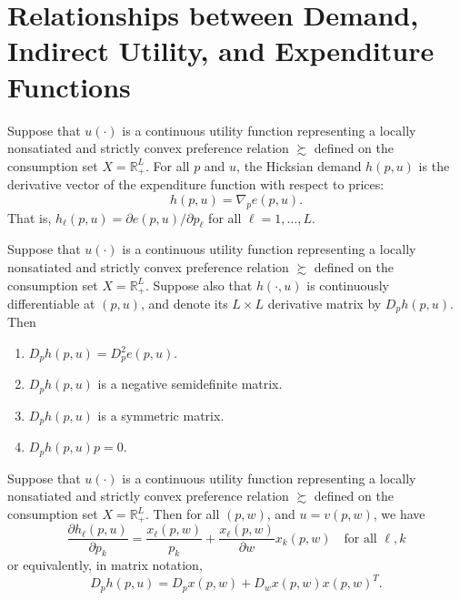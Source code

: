 \section{Relationships between Demand, Indirect Utility, and Expenditure Functions}

\begin{prop}
    Suppose that $u(\cdot)$ is a continuous utility function representing a locally nonsatiated and strictly convex preference relation $\succsim$ defined on the consumption set $X = \mathbb{R}^L_+$. For all $p$ and $u$, the Hicksian demand $h(p, u)$ is the derivative vector of the expenditure function with respect to prices:
    \begin{equation*}
        h(p, u) = \nabla_p e(p, u).
    \end{equation*}
    That is, $h_\ell (p, u) = \partial e(p, u) / \partial p_\ell$ for all $\ell = 1, \dots, L$.
\end{prop}

\begin{prop}
    Suppose that $u(\cdot)$ is a continuous utility function representing a locally nonsatiated and strictly convex preference relation $\succsim$ defined on the consumption set $X = \mathbb{R}^L_+$. Suppose also that $h(\cdot, u)$ is continuously differentiable at $(p, u)$, and denote its $L \times L$ derivative matrix by $D_p h(p, u)$. Then
    \begin{enumerate}
        \item $D_p h(p, u) = D_p^2 e(p, u).$
        \item $D_p h(p, u)$ is a negative semidefinite matrix.
        \item $D_p h(p, u)$ is a symmetric matrix.
        \item $D_p h(p, u) p = 0$.
    \end{enumerate}
\end{prop}

\begin{prop}
    Suppose that $u(\cdot)$ is a continuous utility function representing a locally nonsatiated and strictly convex preference relation $\succsim$ defined on the consumption set $X = \mathbb{R}^L_+$. Then for all $(p, w)$, and $u = v(p, w)$, we have 
    \begin{equation*}
        \frac{\partial h_\ell (p, u)}{\partial p_k} = \frac{x_\ell (p, w)}{p_k} + \frac{x_\ell (p, w)}{\partial w} x_k (p, w) \quad \text{for all } \ell, k
    \end{equation*}
    or equivalently, in matrix notation,
    \begin{equation*}
        D_p h(p, u) = D_p x(p, w) + D_w x(p, w) x(p, w)^T.
    \end{equation*}
\end{prop}

